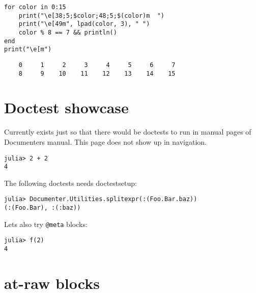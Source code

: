 \begin{verbatim}
for color in 0:15
    print("\e[38;5;$color;48;5;$(color)m  ")
    print("\e[49m", lpad(color, 3), " ")
    color % 8 == 7 && println()
end
print("\e[m")
\end{verbatim}


\begin{lstlisting}
    0     1     2     3     4     5     6     7
    8     9    10    11    12    13    14    15

\end{lstlisting}



\section{Doctest showcase}



\label{2602340166667619136}{}


Currently exists just so that there would be doctests to run in manual pages of Documenter{\textquotesingle}s manual. This page does not show up in navigation.




\begin{verbatim}
julia> 2 + 2
4
\end{verbatim}



The following doctests needs doctestsetup:




\begin{verbatim}
julia> Documenter.Utilities.splitexpr(:(Foo.Bar.baz))
(:(Foo.Bar), :(:baz))
\end{verbatim}



Let{\textquotesingle}s also try \texttt{@meta} blocks:






\begin{verbatim}
julia> f(2)
4
\end{verbatim}





\section{at-raw blocks}



\label{14134642751930898430}{}


